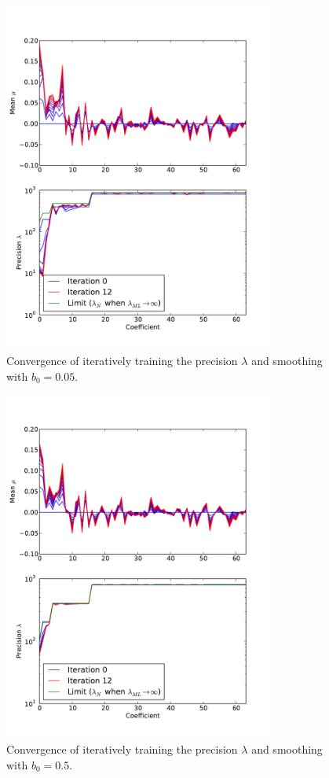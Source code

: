 \documentclass{report}
\begin{document}
\begin{figure}
    \centering
    \includegraphics[width=0.8\textwidth]{figs/p3.pdf}
    \caption{Convergence of iteratively training the precision $\lambda$ and smoothing with $b_0 = 0.05$.} \label{fig:iter3}
\end{figure}

\begin{figure}
    \centering
    \includegraphics[width=0.8\textwidth]{figs/p4.pdf}
    \caption{Convergence of iteratively training the precision $\lambda$ and smoothing with $b_0 = 0.5$.} \label{fig:iter4}
\end{figure}
\end{document}
